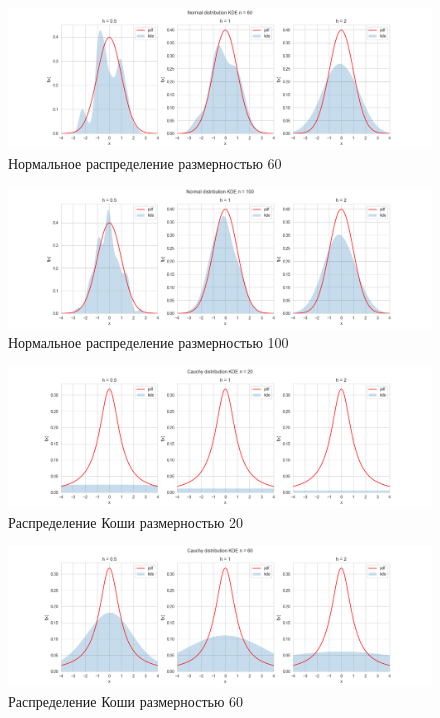 \documentclass[a4paper,14pt]{article}
\begin{document}
	\begin{figure}[H]
		\centering
		\includegraphics[scale=0.35]{../image/lab4/lab4_kde_norm_60.png}
		\caption{Нормальное распределение размерностью 60}
	\end{figure}
	
	\begin{figure}[H]
		\centering
		\includegraphics[scale=0.35]{../image/lab4/lab4_kde_norm_100.png}
		\caption{Нормальное распределение размерностью 100}
	\end{figure}
	
	\begin{figure}[H]
		\centering
		\includegraphics[scale=0.35]{../image/lab4/lab4_kde_cauchy_20.png}
		\caption{Распределение Коши размерностью 20}
	\end{figure}
	
	\begin{figure}[H]
		\centering
		\includegraphics[scale=0.35]{../image/lab4/lab4_kde_cauchy_60.png}
		\caption{Распределение Коши размерностью 60}
	\end{figure}
	
\end{document}
